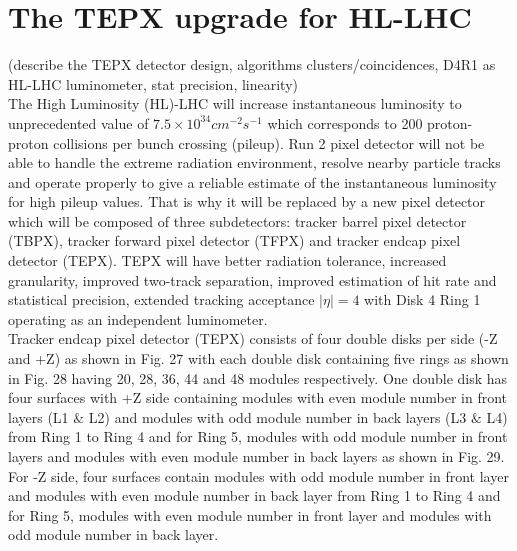 \newpage \section{The TEPX upgrade for HL-LHC}
\label{sec:tepx}
(describe the TEPX detector design, algorithms clusters/coincidences, D4R1 as HL-LHC luminometer, stat precision, linearity)\\

The High Luminosity (HL)-LHC will increase instantaneous luminosity to unprecedented value of $7.5 \times 10^{34} cm^{-2} s^{-1}$ which corresponds to 200 proton-proton collisions per bunch crossing (pileup). Run 2 pixel detector will not be able to handle the extreme radiation environment, resolve nearby particle tracks and operate properly to give a reliable estimate of the instantaneous luminosity for high pileup values. That is why it will be replaced by a new pixel detector which will be composed of three subdetectors: tracker barrel pixel detector (TBPX), tracker forward pixel detector (TFPX) and tracker endcap pixel detector (TEPX). TEPX will have better radiation tolerance, increased granularity, improved two-track separation, improved estimation of hit rate and statistical precision, extended tracking acceptance $|\eta|=4$ with Disk 4 Ring 1 operating as an independent luminometer. \\

Tracker endcap pixel detector (TEPX) consists of four double disks per side (-Z and +Z) as shown in Fig. 27 with each double disk containing five rings as shown in Fig. 28 having 20, 28, 36, 44 and 48 modules respectively. One double disk has four surfaces with +Z side containing modules with even module number in front layers (L1 $\&$ L2) and modules with odd module number in back layers (L3 $\&$ L4) from Ring 1 to Ring 4 and for Ring 5, modules with odd module number in front layers and modules with even module number in back layers as shown in Fig. 29. For -Z side, four surfaces contain modules with odd module number in front layer and modules with even module number in back layer from Ring 1 to Ring 4 and for Ring 5, modules with even module number in front layer and modules with odd module number in back layer. \\


